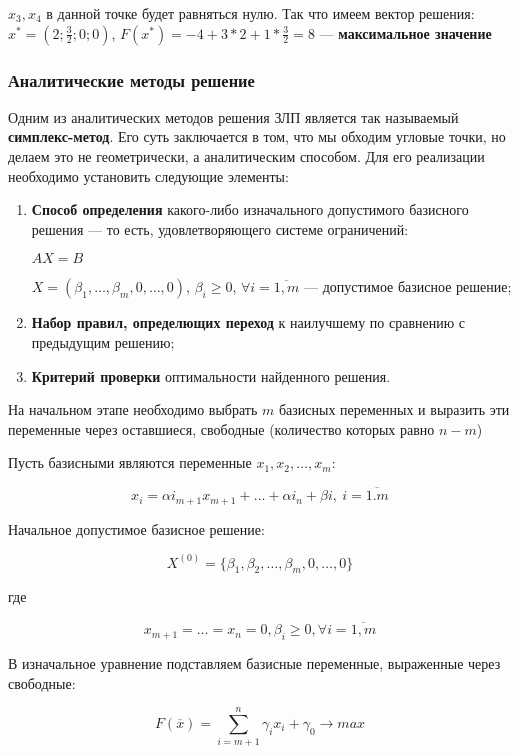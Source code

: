 \documentclass{article}
\begin{document}
$x_3, x_4$ в данной точке будет равняться нулю. Так что имеем вектор решения: $x^{*} = (2; \frac{3}{2}; 0; 0)$, $F(x^{*}) = -4 + 3 * 2 + 1 * \frac{3}{2} = 8$ — \textbf{максимальное значение}

\subsubsection{Аналитические методы решение}

Одним из аналитических методов решения ЗЛП является так называемый \textbf{симплекс-метод}. Его суть заключается в том, что мы обходим угловые точки, но делаем это не геометрически, а аналитическим способом. Для его реализации необходимо установить следующие элементы:

\begin{enumerate}
    \item \textbf{Способ определения} какого-либо изначального допустимого базисного решения — то есть, удовлетворяющего системе ограничений:
    
    $AX = B$

    $X = (\beta_1, \dots, \beta_m, 0, \dots, 0)$, $\beta_{i} \ge 0$, $\forall i = \overline{1, m}$ — допустимое базисное решение;
    \item \textbf{Набор правил, определющих переход} к наилучшему по сравнению с предыдущим решению;
    \item \textbf{Критерий проверки} оптимальности найденного решения.
\end{enumerate}

На начальном этапе необходимо выбрать $m$ базисных переменных и выразить эти переменные через оставшиеся, свободные (количество которых равно $n - m$)

Пусть базисными являются переменные $x_1, x_2, \dots, x_{m}$:

$$
x_{i} = \alpha i_{m + 1} x_{m + 1} + \dots + \alpha i_{n} + \beta i, \ i = \overline{1. m}
$$

Начальное допустимое базисное решение:

$$
X^{(0)} = \{ \beta_1, \beta_2, \dots, \beta_m, 0, \dots, 0 \}
$$

где 

$$x_{m + 1} = \dots = x_{n} = 0, \beta_{i} \ge 0, \forall i = \overline{1, m}$$

В изначальное уравнение подставляем базисные переменные, выраженные через свободные:

$$
F(\overline{x}) = \sum\limits_{i = m + 1}^{n} \gamma_{i} x_i + \gamma_0 \to max
$$
\end{document}
